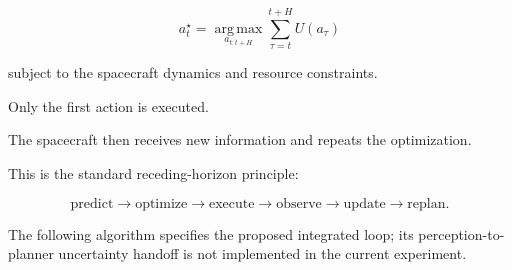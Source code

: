 \documentclass[11pt,a4paper]{article}
\newcommand{\argmax}{\operatorname*{arg\,max}}
\begin{document}
\begin{equation}
a_t^\star
=
\argmax_{a_{t:t+H}}
\sum_{\tau=t}^{t+H}
U(a_\tau)
\end{equation}

subject to the spacecraft dynamics and resource constraints.

Only the first action is executed.

The spacecraft then receives new information and repeats the
optimization.

This is the standard receding-horizon principle:

\begin{equation}
\boxed{
\text{predict}
\rightarrow
\text{optimize}
\rightarrow
\text{execute}
\rightarrow
\text{observe}
\rightarrow
\text{update}
\rightarrow
\text{replan}.
}
\end{equation}


The following algorithm specifies the proposed integrated loop; its
perception-to-planner uncertainty handoff is not implemented in the
current experiment.
\end{document}
